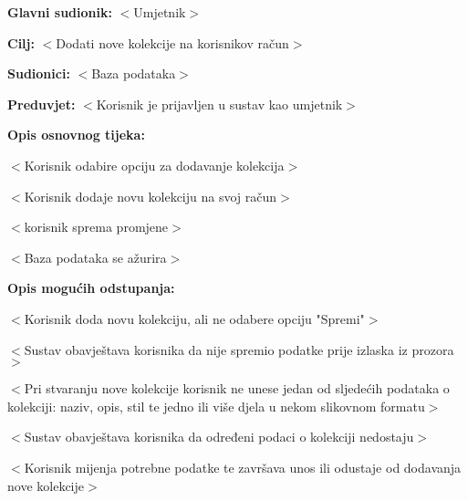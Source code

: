 					\noindent {}
					\begin{packed_item}
						
						\item \textbf{Glavni sudionik: }$<$Umjetnik$>$
						\item  \textbf{Cilj:} $<$Dodati nove kolekcije na korisnikov račun$>$
						\item  \textbf{Sudionici:} $<$Baza podataka$>$
						\item  \textbf{Preduvjet:} $<$Korisnik je prijavljen u sustav kao umjetnik$>$
						\item  \textbf{Opis osnovnog tijeka:}
						
						\item[] \begin{packed_enum}
							
							\item $<$Korisnik odabire opciju za dodavanje kolekcija$>$
							\item $<$Korisnik dodaje novu kolekciju na svoj račun$>$
							\item $<$korisnik sprema promjene$>$
							\item $<$Baza podataka se ažurira$>$					
						\end{packed_enum}
						
						\item  \textbf{Opis mogućih odstupanja:}
						
						\item[] \begin{packed_item}
							
							\item[2.a] $<$Korisnik doda novu kolekciju, ali ne odabere opciju "Spremi"$>$
							\item[] \begin{packed_enum}
								
								\item $<$Sustav obavještava korisnika da nije spremio podatke prije izlaska iz prozora$>$
								
							\end{packed_enum}
						
							\item[2.b] $<$Pri stvaranju nove kolekcije korisnik ne unese jedan od sljedećih podataka o kolekciji:
							naziv, opis, stil te jedno ili više djela u nekom slikovnom formatu$>$
							\item[] \begin{packed_enum}
								
								\item $<$Sustav obavještava korisnika da određeni podaci o kolekciji nedostaju$>$
								\item $<$Korisnik mijenja potrebne podatke te završava 
								unos ili odustaje od dodavanja nove kolekcije$>$
							\end{packed_enum}
							
						\end{packed_item}
					\end{packed_item}
					

